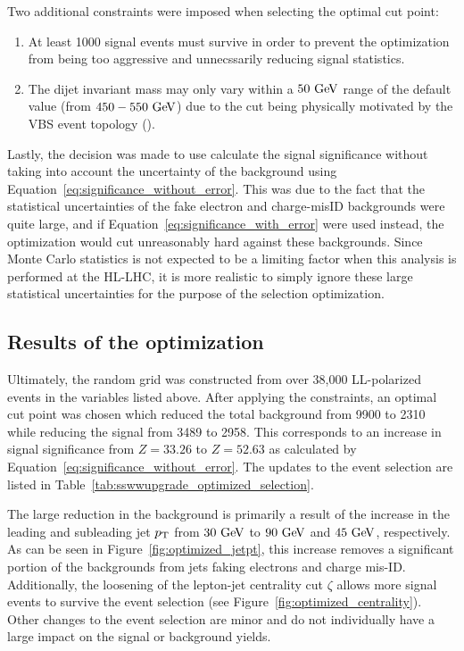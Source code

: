 Two additional constraints were imposed when selecting the optimal cut point:
\begin{enumerate}
\item At least 1000 signal events must survive in order to prevent the optimization from being too aggressive and unnecssarily reducing signal statistics.
\item The dijet invariant mass may only vary within a $50\gev$ range of the default value (from $450-550\gev$) due to the cut being physically motivated by the VBS event topology ().
\end{enumerate}

Lastly, the decision was made to use calculate the signal significance without taking into account the uncertainty of the background using Equation~\ref{eq:significance_without_error}.
This was due to the fact that the statistical uncertainties of the fake electron and charge-misID backgrounds were quite large, and if Equation~\ref{eq:significance_with_error} were used instead, the optimization would cut unreasonably hard against these backgrounds.
Since Monte Carlo statistics is not expected to be a limiting factor when this analysis is performed at the HL-LHC, it is more realistic to simply ignore these large statistical uncertainties for the purpose of the selection optimization.

%
\subsection{Results of the optimization}\label{sswwupgrade:opt_results}
Ultimately, the random grid was constructed from over 38,000 LL-polarized \ssww events in the variables listed above.
After applying the constraints, an optimal cut point was chosen which reduced the total background from 9900 to 2310 while reducing the signal from 3489 to 2958.
This corresponds to an increase in signal significance from $Z = 33.26$ to $Z = 52.63$ as calculated by Equation~\ref{eq:significance_without_error}.
The updates to the event selection are listed in Table~\ref{tab:sswwupgrade_optimized_selection}. %

The large reduction in the background is primarily a result of the increase in the leading and subleading jet $p_{\mathrm{T}}$ from $30\gev$ to $90\gev$ and $45\gev$, respectively.
As can be seen in Figure~\ref{fig:optimized_jetpt}, this increase removes a significant portion of the backgrounds from jets faking electrons and charge mis-ID.
Additionally, the loosening of the lepton-jet centrality cut $\zeta$ allows more signal events to survive the event selection (see Figure~\ref{fig:optimized_centrality}).
Other changes to the event selection are minor and do not individually have a large impact on the signal or background yields.

